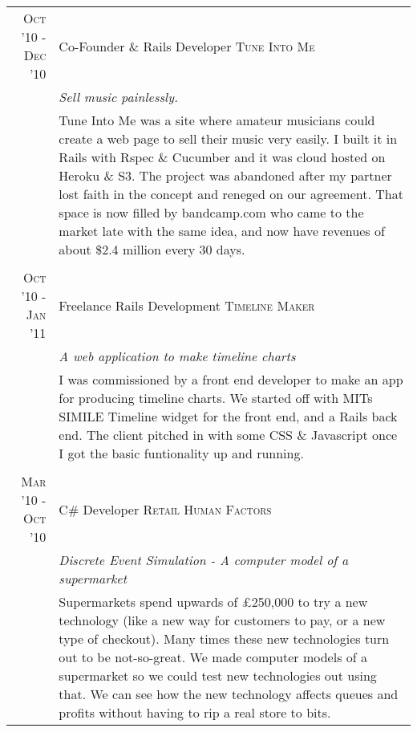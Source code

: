 \documentclass[a4paper,11pt]{article}
\begin{document}
\begin{tabular}{r|p{11.2cm}}
  \textsc{Oct '10 - Dec '10} & Co-Founder \& Rails Developer \textsc{Tune Into Me} \\
                             &\emph{Sell music painlessly.}\\
                             &\footnotesize{Tune Into Me was a site where amateur musicians could create a web
  page to sell their music very easily. I built it in Rails with Rspec \& Cucumber and it was cloud hosted
  on Heroku \& S3. The project was abandoned after my partner lost faith in the concept and reneged on
  our agreement. That space is now filled by bandcamp.com who came to the market late with the same
  idea, and now have revenues of about \$2.4 million every 30 days.}
  \\\multicolumn{2}{c}{} \\
  \textsc{Oct '10 - Jan '11} & Freelance Rails Development \textsc{Timeline Maker} \\
                             &\emph{A web application to make timeline charts}\\
                             &\footnotesize{ I was commissioned by a front end developer to make an app for
  producing timeline charts. We started off with MITs SIMILE Timeline widget for the front end, and a Rails
  back end. The client pitched in with some CSS \& Javascript once I got the basic funtionality up and
  running. }
  \\\multicolumn{2}{c}{} \\
  \textsc{Mar '10 - Oct '10} & C\# Developer \textsc{Retail Human Factors} \\
                             &\emph{Discrete Event Simulation - A computer model of a supermarket}\\
                             &\footnotesize{ Supermarkets spend upwards of \pounds250,000 to try a
  new technology (like a new way for customers to pay, or a new type of checkout). Many times these
  new technologies turn out to be not-so-great. We made computer models of a supermarket so we could
  test new technologies out using that. We can see how the new technology affects queues and profits
  without having to rip a real store to bits.}
\end{tabular}
\end{document}
